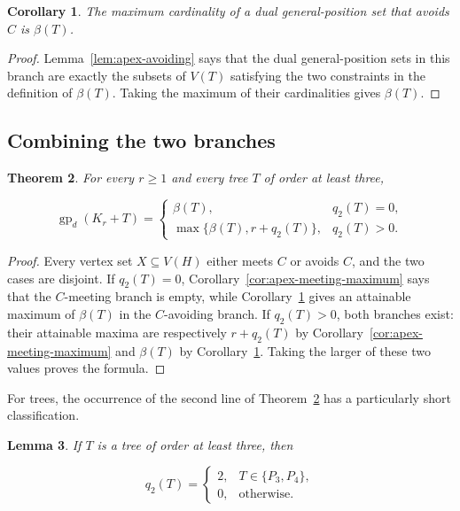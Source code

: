 \documentclass[preprint,12pt]{elsarticle}
\newtheorem{theorem}{Theorem}[section]
\newtheorem{lemma}[theorem]{Lemma}
\newtheorem{corollary}[theorem]{Corollary}
\numberwithin{equation}{section}
\begin{document}
\begin{corollary}\label{cor:apex-avoiding-maximum}
The maximum cardinality of a dual
general-position set that avoids \(C\) is \(\beta(T)\).
\end{corollary}

\begin{proof}
Lemma~\ref{lem:apex-avoiding} says that the dual general-position sets in
this branch are exactly the subsets of \(V(T)\) satisfying the two
constraints in the definition of \(\beta(T)\). Taking the maximum of
their cardinalities gives \(\beta(T)\).
\end{proof}

\subsection{Combining the two branches}\label{sec:combining}

\begin{theorem}\label{thm:two-branch}
For every \(r\ge 1\) and every tree \(T\) of order
at least three,

\[
\operatorname{gp}_d(K_r+T)=
\begin{cases}
\beta(T),&q_2(T)=0,\\
\max\{\beta(T),r+q_2(T)\},&q_2(T)>0.
\end{cases}
\]
\end{theorem}

\begin{proof}
Every vertex set \(X\subseteq V(H)\) either meets \(C\)
or avoids \(C\), and the two cases are disjoint. If \(q_2(T)=0\),
Corollary~\ref{cor:apex-meeting-maximum} says that the \(C\)-meeting branch is empty, while
Corollary~\ref{cor:apex-avoiding-maximum} gives an attainable maximum of \(\beta(T)\) in the
\(C\)-avoiding branch. If \(q_2(T)>0\), both branches exist: their
attainable maxima are respectively \(r+q_2(T)\) by Corollary~\ref{cor:apex-meeting-maximum} and
\(\beta(T)\) by Corollary~\ref{cor:apex-avoiding-maximum}. Taking the larger of these two values
proves the formula.
\end{proof}

For trees, the occurrence of the second line of Theorem~\ref{thm:two-branch} has a
particularly short classification.

\begin{lemma}\label{lem:q2-trees}
If \(T\) is a tree of order at least three, then

\[
q_2(T)=
\begin{cases}
2,&T\in\{P_3,P_4\},\\
0,&\text{otherwise}.
\end{cases}
\]
\end{lemma}
\end{document}
